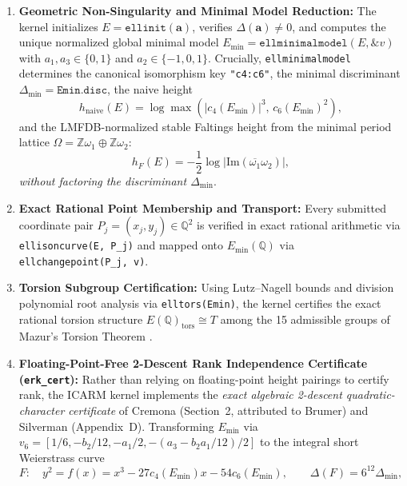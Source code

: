 \documentclass[10pt,a4paper]{article}
\theoremstyle{plain}
\theoremstyle{definition}
\theoremstyle{remark}
\begin{document}
\begin{enumerate}[leftmargin=2em]
    \item \textbf{Geometric Non-Singularity and Minimal Model Reduction:} The kernel initializes $E = \mathtt{ellinit}(\mathbf{a})$, verifies $\Delta(\mathbf{a}) \neq 0$, and computes the unique normalized global minimal model $E_{\min} = \mathtt{ellminimalmodel}(E, \&v)$ with $a_1, a_3 \in \{0, 1\}$ and $a_2 \in \{-1, 0, 1\}$. Crucially, \texttt{ellminimalmodel} determines the canonical isomorphism key \texttt{"c4:c6"}, the minimal discriminant $\Delta_{\min} = \mathtt{Emin.disc}$, the naive height
    \begin{equation}
    h_{\text{naive}}(E) = \log \max\!\left(|c_4(E_{\min})|^3,\, c_6(E_{\min})^2\right),
    \end{equation}
    and the LMFDB-normalized stable Faltings height from the minimal period lattice $\Omega = \mathbb{Z}\omega_1 \oplus \mathbb{Z}\omega_2$:
    \begin{equation}
    h_F(E) = -\frac{1}{2} \log \left|\mathrm{Im}(\overline{\omega_1}\omega_2)\right|,
    \end{equation}
    \emph{without factoring the discriminant $\Delta_{\min}$}.
    \item \textbf{Exact Rational Point Membership and Transport:} Every submitted coordinate pair $P_j = (x_j, y_j) \in \mathbb{Q}^2$ is verified in exact rational arithmetic via \texttt{ellisoncurve(E, P\_j)} and mapped onto $E_{\min}(\mathbb{Q})$ via \texttt{ellchangepoint(P\_j, v)}.
    \item \textbf{Torsion Subgroup Certification:} Using Lutz--Nagell bounds and division polynomial root analysis via \texttt{elltors(Emin)}, the kernel certifies the exact rational torsion structure $E(\mathbb{Q})_{\text{tors}} \cong T$ among the 15 admissible groups of Mazur's Torsion Theorem \cite{mazur1977modular}.
    \item \textbf{Floating-Point-Free 2-Descent Rank Independence Certificate (\texttt{erk\_cert}):} Rather than relying on floating-point height pairings to certify rank, the ICARM kernel implements the \emph{exact algebraic 2-descent quadratic-character certificate} of Cremona \cite{cremona2006filter} (Section~2, attributed to Brumer) and Silverman \cite{silverman2000xedni} (Appendix~D). Transforming $E_{\min}$ via $v_6 = [1/6, -b_2/12, -a_1/2, -(a_3 - b_2 a_1/12)/2]$ to the integral short Weierstrass curve
    \begin{equation}\label{eq:short_model_F}
    F: \quad y^2 = f(x) = x^3 - 27 c_4(E_{\min}) x - 54 c_6(E_{\min}), \qquad \Delta(F) = 6^{12} \Delta_{\min},

\end{equation}
\end{enumerate}
\end{document}
